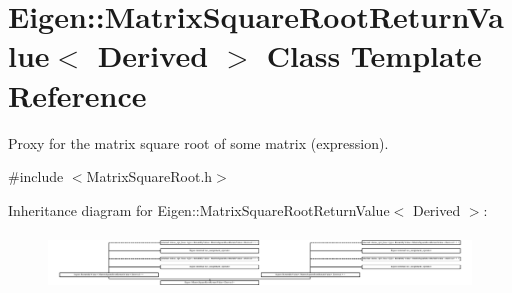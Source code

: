\hypertarget{class_eigen_1_1_matrix_square_root_return_value}{}\section{Eigen\+:\+:Matrix\+Square\+Root\+Return\+Value$<$ Derived $>$ Class Template Reference}
\label{class_eigen_1_1_matrix_square_root_return_value}


Proxy for the matrix square root of some matrix (expression).  




{\ttfamily \#include $<$Matrix\+Square\+Root.\+h$>$}

Inheritance diagram for Eigen\+:\+:Matrix\+Square\+Root\+Return\+Value$<$ Derived $>$\+:\begin{figure}[H]
\begin{center}
\leavevmode
\includegraphics[height=1.492007cm]{class_eigen_1_1_matrix_square_root_return_value}
\end{center}
\end{figure}
